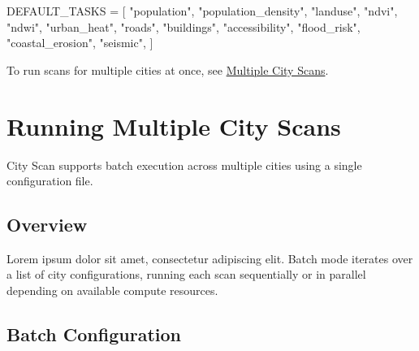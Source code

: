 \documentclass[
  letterpaper,
  DIV=11,
  numbers=noendperiod]{scrreprt}
\newenvironment{Shaded}{\begin{snugshade}}{\end{snugshade}}
\newcommand{\NormalTok}[1]{\textcolor[rgb]{0.00,0.23,0.31}{#1}}
\newcommand{\OperatorTok}[1]{\textcolor[rgb]{0.37,0.37,0.37}{#1}}
\newcommand{\StringTok}[1]{\textcolor[rgb]{0.13,0.47,0.30}{#1}}
\begin{document}
\begin{Shaded}
\begin{Highlighting}[]
\NormalTok{DEFAULT\_TASKS }\OperatorTok{=}\NormalTok{ [}
    \StringTok{"population"}\NormalTok{, }\StringTok{"population\_density"}\NormalTok{,}
    \StringTok{"landuse"}\NormalTok{, }\StringTok{"ndvi"}\NormalTok{, }\StringTok{"ndwi"}\NormalTok{, }\StringTok{"urban\_heat"}\NormalTok{,}
    \StringTok{"roads"}\NormalTok{, }\StringTok{"buildings"}\NormalTok{, }\StringTok{"accessibility"}\NormalTok{,}
    \StringTok{"flood\_risk"}\NormalTok{, }\StringTok{"coastal\_erosion"}\NormalTok{, }\StringTok{"seismic"}\NormalTok{,}
\NormalTok{]}
\end{Highlighting}
\end{Shaded}

\begin{tcolorbox}[enhanced jigsaw, arc=.35mm, bottomrule=.15mm, bottomtitle=1mm, breakable, colback=white, colbacktitle=quarto-callout-note-color!10!white, colframe=quarto-callout-note-color-frame, coltitle=black, left=2mm, leftrule=.75mm, opacityback=0, opacitybacktitle=0.6, rightrule=.15mm, title=\textcolor{quarto-callout-note-color}{\faInfo}\hspace{0.5em}{Note}, titlerule=0mm, toprule=.15mm, toptitle=1mm]

To run scans for multiple cities at once, see
\href{multiple-cityscan.qmd}{Multiple City Scans}.

\end{tcolorbox}

\chapter{Running Multiple City Scans}\label{running-multiple-city-scans}

City Scan supports batch execution across multiple cities using a single
configuration file.

\section{Overview}\label{overview}

Lorem ipsum dolor sit amet, consectetur adipiscing elit. Batch mode
iterates over a list of city configurations, running each scan
sequentially or in parallel depending on available compute resources.

\section{Batch Configuration}\label{batch-configuration}
\end{document}
